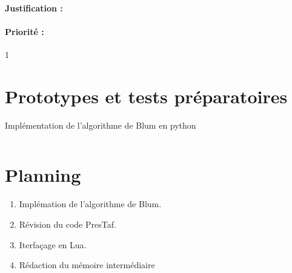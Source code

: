 \documentclass{article}%
\begin{document}
\paragraph{Justification :}

\paragraph{Priorité :} 1

\section{Prototypes et tests préparatoires}

Implémentation de l'algorithme de Blum en python

\begin{lstlisting}

\end{lstlisting}


\begin{tikzpicture}

\end{tikzpicture}



\section{Planning}

\begin{enumerate}
\item Implémation de l'algorithme de Blum.
\item Révision du code PresTaf.
\item Iterfaçage en Lua.
\item Rédaction du mémoire intermédiaire
\end{enumerate}

{}



\appendix

\printglossaries

\end{document}
